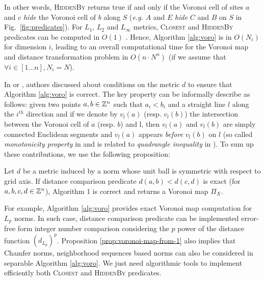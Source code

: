\documentclass{llncs}
\begin{document}
In other words, \textsc{HiddenBy} returns true if and only if the
Voronoi cell of sites $a$ and $c$ \emph{hide} the Voronoi cell of $b$
along $S$ (\emph{e.g.} $A$ and $E$ \emph{hide} $C$ and $B$ on $S$ in
Fig.~\ref{fig:predicates}).  For $L_1$, $L_2$ and $L_\infty$ metrics,
\textsc{Closest} and \textsc{HiddenBy} predicates can be computed in
$O(1)$ \cite{Breu1995,Hirata1996,Meijster2000}. Hence, Algorithm
\ref{alg:voro} is in $O(N_i)$ for dimension $i$, leading to an overall
computational time for the Voronoi map and distance transformation
problem in $O(n\cdot N^n)$ (if we assume that $\forall i\in[1\ldots
  n], N_i=N$).

In \cite{Hirata1996} or \cite{maurer_pami}, authors discussed about
conditions on the metric $d$ to ensure that Algorithm \ref{alg:voro}
is correct. The key property can be informally describe as follows:
given two points $a,b\in{\mathbb{Z}}^n$ such that $a_i<b_i$ and a straight line
$l$ along the $i^{th}$ direction and if we denote by $v_l(a)$
(resp. $v_l(b)$) the intersection between the Voronoi cell of $a$
(resp. $b$) and l, then $v_l(a)$ and $v_l(b)$ are simply connected
Euclidean segments and $v_l(a)$ appears \emph{before} $v_l(b)$ on $l$
(so called \emph{monotonicity property} in \cite{Maurer2003} and is
related to \emph{quadrangle inequality} in \cite{Hirata1996}).  To sum
up these contributions, we use the following proposition:
\begin{proposition}
\label{prop:voronoi-map-from-1}
  Let $d$ be a metric induced by a norm whose unit ball is symmetric
  with respect to grid axis. If distance comparison predicate
  $d(a,b)<d(c,d)$ is exact (for $a,b,c,d\in{\mathbb{Z}}^n$), Algorithm 1 is
  correct and returns a Voronoi map $\Pi_X$.
\end{proposition}

For example, Algorithm \ref{alg:voro} provides exact Voronoi map
computation for $L_p$ norms. In such case, distance comparison
predicate can be implemented error-free form integer number comparison
considering the $p$ power of the distance function $\left
(d_{L_p}\right)^p$.  Proposition \ref{prop:voronoi-map-from-1} also
implies that Chamfer norms, neighborhood sequences based norms can
also be considered in separable Algorithm \ref{alg:voro}. We just need
algorithmic tools to implement efficiently both \textsc{Closest} and
\textsc{HiddenBy} predicates.
\end{document}
